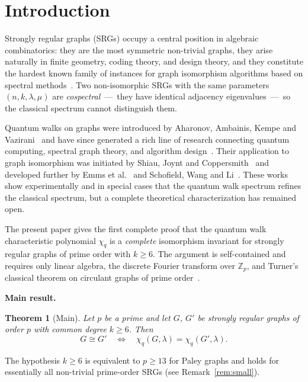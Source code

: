 \documentclass[12pt]{article}
\newtheorem{theorem}{Theorem}[section]
\newcommand{\Z}{\mathbb{Z}}
\begin{document}
\section{Introduction}
\label{sec:intro}

Strongly regular graphs (SRGs) occupy a central position in algebraic
combinatorics: they are the most symmetric non-trivial graphs, they arise
naturally in finite geometry, coding theory, and design theory, and they
constitute the hardest known family of instances for graph isomorphism
algorithms based on spectral methods~\cite{Babai2016,WeisfeilerLeman1968}.
Two non-isomorphic SRGs with the same parameters $(n,k,\lambda,\mu)$ are
\emph{cospectral}~---~they have identical adjacency eigenvalues~---~so the
classical spectrum cannot distinguish them.

Quantum walks on graphs were introduced by Aharonov, Ambainis, Kempe and
Vazirani~\cite{AAKV2001} and have since generated a rich line of research
connecting quantum computing, spectral graph theory, and algorithm
design~\cite{Kempe2003}.  Their application to graph isomorphism was
initiated by Shiau, Joynt and Coppersmith~\cite{ShiauJC2005} and developed
further by Emms et al.~\cite{Emms2009} and Schofield, Wang and
Li~\cite{Schofield2020}.  These works show experimentally and in special
cases that the quantum walk spectrum refines the classical spectrum, but a
complete theoretical characterization has remained open.

The present paper gives the first complete proof that the quantum walk
characteristic polynomial $\chi_q$ is a \emph{complete} isomorphism
invariant for strongly regular graphs of prime order with $k \geq 6$.  The
argument is self-contained and requires only linear algebra, the discrete
Fourier transform over $\Z_p$, and Turner's classical theorem on circulant
graphs of prime order~\cite{Turner1967}.

\medskip
\noindent\textbf{Main result.}

\begin{theorem}[Main]\label{thm:main}
  Let $p$ be a prime and let $G$, $G'$ be strongly regular graphs of order
  $p$ with common degree $k \geq 6$.  Then
  \[
    G \cong G' \quad\iff\quad \chi_q(G,\lambda) = \chi_q(G',\lambda).
  \]
\end{theorem}

\noindent The hypothesis $k \geq 6$ is equivalent to $p \geq 13$ for Paley
graphs and holds for essentially all non-trivial prime-order SRGs (see
Remark~\ref{rem:small}).
\end{document}
